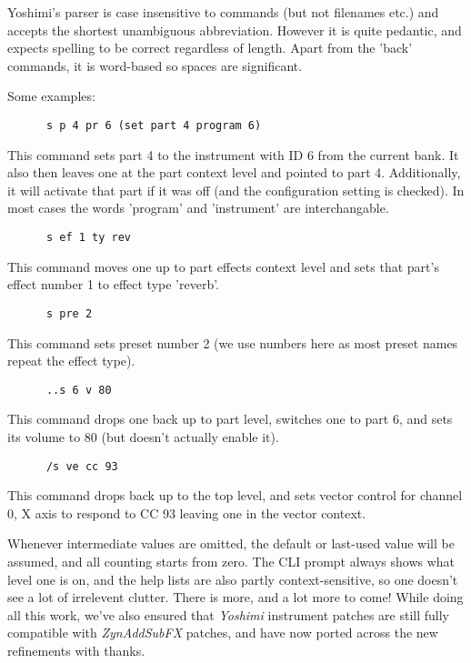 \documentclass[
 11pt,
 twoside,
 a4paper,
 headinclude,
 footinclude,
 final                                 %
]{article}
\begin{document}
   Yoshimi's parser is case insensitive to commands (but not filenames etc.)
   and accepts the shortest unambiguous abbreviation. However it is quite
   pedantic, and expects spelling to be correct regardless of length. Apart
   from the 'back' commands, it is word-based so spaces are significant.

   Some examples:

   \begin{verbatim}
      s p 4 pr 6 (set part 4 program 6)
   \end{verbatim}

   This command sets part 4 to the instrument with ID 6 from the current bank.
   It also then leaves one at the part context level and pointed to part 4.
   Additionally, it will activate that part if it was off (and the
   configuration setting is checked). In most cases the words 'program' and
   'instrument' are interchangable.

   \begin{verbatim}
      s ef 1 ty rev
   \end{verbatim}

   This command moves one up to part effects context level and sets that part's
   effect number 1 to effect type 'reverb'.

   \begin{verbatim}
      s pre 2
   \end{verbatim}

   This command sets preset number 2 (we use numbers here as most preset names
   repeat the effect type).

   \begin{verbatim}
      ..s 6 v 80
   \end{verbatim}

   This command drops one back up to part level, switches one to part 6, and
   sets its volume to 80 (but doesn't actually enable it).

   \begin{verbatim}
      /s ve cc 93
   \end{verbatim}

   This command drops back up to the top level, and sets vector control for
   channel 0, X axis to respond to CC 93 leaving one in the vector context.

   Whenever intermediate values are omitted, the default or last-used value
   will be assumed, and all counting starts from zero.  The CLI prompt always
   shows what level one is on, and the help lists are also partly
   context-sensitive, so one doesn't see a lot of irrelevent clutter.  There is
   more, and a lot more to come!  While doing all this work, we've also ensured
   that \textsl{Yoshimi} instrument patches are still fully compatible with
   \textsl{ZynAddSubFX} patches, and have now ported across the new refinements
   with thanks.
\end{document}
